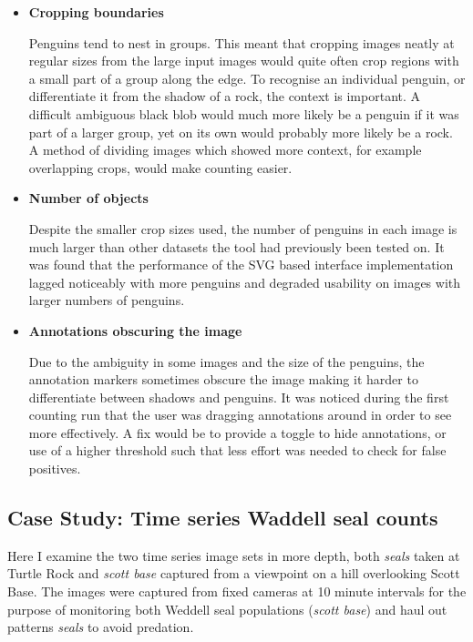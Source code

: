 \begin{itemize}
    \item {\textbf{Cropping boundaries}}\par
Penguins tend to nest in groups. This meant that cropping images neatly at regular sizes from the large input images would quite often crop regions with a small part of a group along the edge. To recognise an individual penguin, or differentiate it from the shadow of a rock, the context is important. A difficult ambiguous black blob would much more likely be a penguin if it was part of a larger group, yet on its own would probably more likely be a rock. A method of dividing images which showed more context, for example overlapping crops, would make counting easier.
    \item {\textbf{Number of objects}}\par
Despite the smaller crop sizes used, the number of penguins in each image is much larger than other datasets the tool had previously been tested on. It was found that the performance of the \gls{SVG} based interface implementation lagged noticeably with more penguins and degraded usability on images with larger numbers of penguins. 
    \item {\textbf{Annotations obscuring the image}}\par
Due to the ambiguity in some images and the size of the penguins,  the annotation markers sometimes obscure the image making it harder to differentiate between shadows and penguins. It was noticed during the first counting run that the user was dragging annotations around in order to see more effectively. A fix would be to provide a toggle to hide annotations, or use of a higher threshold such that less effort was needed to check for false positives.

\end{itemize}


\subsection{Case Study: Time series Waddell seal counts}
\label{sec:case_seals}

Here I examine the two time series image sets in more depth, both \emph{seals} taken at Turtle Rock and \emph{scott base} captured from a viewpoint on a hill overlooking Scott Base. The images were captured from fixed cameras at 10 minute intervals for the purpose of monitoring both Weddell seal populations (\emph{scott base}) and haul out patterns \emph{seals} to avoid predation. 


